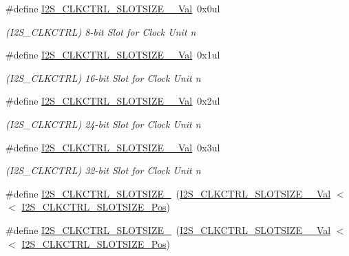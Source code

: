 \begin{DoxyCompactItemize}
\#define \mbox{\hyperlink{group___s_a_m_d21___i2_s_ga8bdf35936a6d3d62de0c94cde31b1c94}{I2\+S\+\_\+\+C\+L\+K\+C\+T\+R\+L\+\_\+\+S\+L\+O\+T\+S\+I\+Z\+E\+\_\+\_\+\+Val}}~0x0ul
\begin{DoxyCompactList}\small\item\em (I2\+S\+\_\+\+C\+L\+K\+C\+T\+RL) 8-\/bit Slot for Clock Unit n \end{DoxyCompactList}\item 
\#define \mbox{\hyperlink{group___s_a_m_d21___i2_s_ga4caa59c4008c74b3ee0a8be8dd02183b}{I2\+S\+\_\+\+C\+L\+K\+C\+T\+R\+L\+\_\+\+S\+L\+O\+T\+S\+I\+Z\+E\+\_\+\_\+\+Val}}~0x1ul
\begin{DoxyCompactList}\small\item\em (I2\+S\+\_\+\+C\+L\+K\+C\+T\+RL) 16-\/bit Slot for Clock Unit n \end{DoxyCompactList}\item 
\#define \mbox{\hyperlink{group___s_a_m_d21___i2_s_gabbc9d2ad05bbc8e24cdc97dcc5ffdd04}{I2\+S\+\_\+\+C\+L\+K\+C\+T\+R\+L\+\_\+\+S\+L\+O\+T\+S\+I\+Z\+E\+\_\+\_\+\+Val}}~0x2ul
\begin{DoxyCompactList}\small\item\em (I2\+S\+\_\+\+C\+L\+K\+C\+T\+RL) 24-\/bit Slot for Clock Unit n \end{DoxyCompactList}\item 
\#define \mbox{\hyperlink{group___s_a_m_d21___i2_s_gaaee0ee592d4468e2abf681def2ad82b7}{I2\+S\+\_\+\+C\+L\+K\+C\+T\+R\+L\+\_\+\+S\+L\+O\+T\+S\+I\+Z\+E\+\_\+\_\+\+Val}}~0x3ul
\begin{DoxyCompactList}\small\item\em (I2\+S\+\_\+\+C\+L\+K\+C\+T\+RL) 32-\/bit Slot for Clock Unit n \end{DoxyCompactList}\item 
\#define \mbox{\hyperlink{group___s_a_m_d21___i2_s_ga9e0141598261a29feaf7035268e56190}{I2\+S\+\_\+\+C\+L\+K\+C\+T\+R\+L\+\_\+\+S\+L\+O\+T\+S\+I\+Z\+E\+\_}}~(\mbox{\hyperlink{group___s_a_m_d21___i2_s_ga8bdf35936a6d3d62de0c94cde31b1c94}{I2\+S\+\_\+\+C\+L\+K\+C\+T\+R\+L\+\_\+\+S\+L\+O\+T\+S\+I\+Z\+E\+\_\+\_\+\+Val}}    $<$$<$ \mbox{\hyperlink{group___s_a_m_d21___i2_s_ga3790543c148a2adda023e411fd6595ad}{I2\+S\+\_\+\+C\+L\+K\+C\+T\+R\+L\+\_\+\+S\+L\+O\+T\+S\+I\+Z\+E\+\_\+\+Pos}})
\item 
\#define \mbox{\hyperlink{group___s_a_m_d21___i2_s_gabb0f421f0ccb2663d741941a78266807}{I2\+S\+\_\+\+C\+L\+K\+C\+T\+R\+L\+\_\+\+S\+L\+O\+T\+S\+I\+Z\+E\+\_}}~(\mbox{\hyperlink{group___s_a_m_d21___i2_s_ga4caa59c4008c74b3ee0a8be8dd02183b}{I2\+S\+\_\+\+C\+L\+K\+C\+T\+R\+L\+\_\+\+S\+L\+O\+T\+S\+I\+Z\+E\+\_\+\_\+\+Val}}   $<$$<$ \mbox{\hyperlink{group___s_a_m_d21___i2_s_ga3790543c148a2adda023e411fd6595ad}{I2\+S\+\_\+\+C\+L\+K\+C\+T\+R\+L\+\_\+\+S\+L\+O\+T\+S\+I\+Z\+E\+\_\+\+Pos}})

\end{DoxyCompactItemize}
